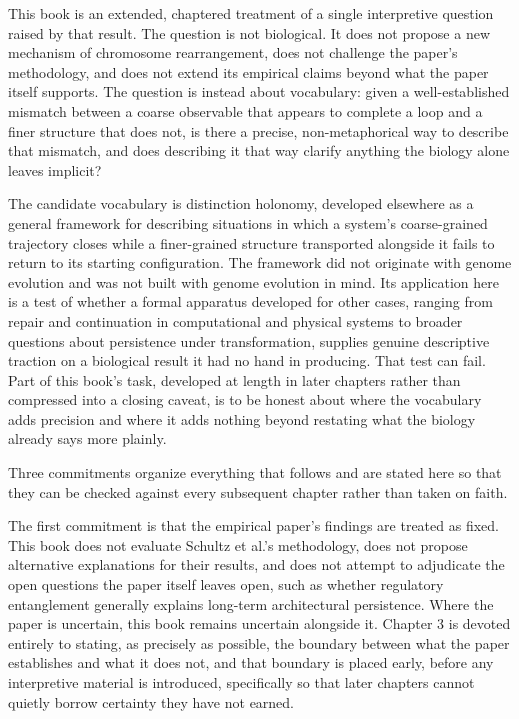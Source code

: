 \documentclass[11pt]{book}
\begin{document}
This book is an extended, chaptered treatment of a single interpretive question raised by that result. The question is not biological. It does not propose a new mechanism of chromosome rearrangement, does not challenge the paper's methodology, and does not extend its empirical claims beyond what the paper itself supports. The question is instead about vocabulary: given a well-established mismatch between a coarse observable that appears to complete a loop and a finer structure that does not, is there a precise, non-metaphorical way to describe that mismatch, and does describing it that way clarify anything the biology alone leaves implicit?

The candidate vocabulary is distinction holonomy, developed elsewhere as a general framework for describing situations in which a system's coarse-grained trajectory closes while a finer-grained structure transported alongside it fails to return to its starting configuration. The framework did not originate with genome evolution and was not built with genome evolution in mind. Its application here is a test of whether a formal apparatus developed for other cases, ranging from repair and continuation in computational and physical systems to broader questions about persistence under transformation, supplies genuine descriptive traction on a biological result it had no hand in producing. That test can fail. Part of this book's task, developed at length in later chapters rather than compressed into a closing caveat, is to be honest about where the vocabulary adds precision and where it adds nothing beyond restating what the biology already says more plainly.

Three commitments organize everything that follows and are stated here so that they can be checked against every subsequent chapter rather than taken on faith.

The first commitment is that the empirical paper's findings are treated as fixed. This book does not evaluate Schultz et al.'s methodology, does not propose alternative explanations for their results, and does not attempt to adjudicate the open questions the paper itself leaves open, such as whether regulatory entanglement generally explains long-term architectural persistence. Where the paper is uncertain, this book remains uncertain alongside it. Chapter 3 is devoted entirely to stating, as precisely as possible, the boundary between what the paper establishes and what it does not, and that boundary is placed early, before any interpretive material is introduced, specifically so that later chapters cannot quietly borrow certainty they have not earned.
\end{document}
